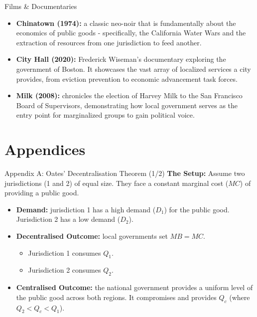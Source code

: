 \documentclass[10pt]{beamer}
\begin{document}
\begin{frame}{Films \& Documentaries}
\begin{itemize}
\item \textbf{Chinatown (1974):} a classic neo-noir that is fundamentally about the economics of public goods - specifically, the California Water Wars and the extraction of resources from one jurisdiction to feed another.
\item \textbf{City Hall (2020):} Frederick Wiseman’s documentary exploring the government of Boston. It showcases the vast array of localized services a city provides, from eviction prevention to economic advancement task forces.
\item \textbf{Milk (2008):} chronicles the election of Harvey Milk to the San Francisco Board of Supervisors, demonstrating how local government serves as the entry point for marginalized groups to gain political voice.
\end{itemize}
\end{frame}


\section*{Appendices}

\begin{frame}{Appendix A: Oates' Decentralisation Theorem (1/2)}
\textbf{The Setup:}
Assume two jurisdictions (1 and 2) of equal size. They face a constant marginal cost ($MC$) of providing a public good.

\begin{itemize}
\item \textbf{Demand:} jurisdiction 1 has a high demand ($D_1$) for the public good. Jurisdiction 2 has a low demand ($D_2$).
\item \textbf{Decentralised Outcome:} local governments set $MB = MC$. 
\begin{itemize}
\item Jurisdiction 1 consumes $Q_1$.
\item Jurisdiction 2 consumes $Q_2$.
\end{itemize}
\item \textbf{Centralised Outcome:} the national government provides a uniform level of the public good across both regions. It compromises and provides $Q_c$ (where $Q_2 < Q_c < Q_1$).
\end{itemize}
\end{frame}
\end{document}
